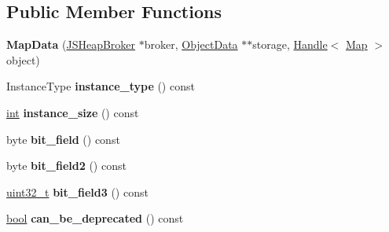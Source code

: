 \subsection*{Public Member Functions}
\begin{DoxyCompactItemize}
\item 
\mbox{\label{classv8_1_1internal_1_1compiler_1_1MapData_afeac92b6f3ab6b57eaa2a49fb5d995cc}} 
{\bfseries Map\+Data} (\mbox{\hyperlink{classv8_1_1internal_1_1compiler_1_1JSHeapBroker}{J\+S\+Heap\+Broker}} $\ast$broker, \mbox{\hyperlink{classv8_1_1internal_1_1compiler_1_1ObjectData}{Object\+Data}} $\ast$$\ast$storage, \mbox{\hyperlink{classv8_1_1internal_1_1Handle}{Handle}}$<$ \mbox{\hyperlink{classv8_1_1internal_1_1Map}{Map}} $>$ object)
\item 
\mbox{\label{classv8_1_1internal_1_1compiler_1_1MapData_a0e88b11af787f03af49e401de65ec6f8}} 
Instance\+Type {\bfseries instance\+\_\+type} () const
\item 
\mbox{\label{classv8_1_1internal_1_1compiler_1_1MapData_aab72a80b587fd67f4ea6ffae0c6bbde1}} 
\mbox{\hyperlink{classint}{int}} {\bfseries instance\+\_\+size} () const
\item 
\mbox{\label{classv8_1_1internal_1_1compiler_1_1MapData_a9962e874f9690c7dd3b7d4f01cbbf4b0}} 
byte {\bfseries bit\+\_\+field} () const
\item 
\mbox{\label{classv8_1_1internal_1_1compiler_1_1MapData_af08b7bbf9f4b204a002280684d5d6bfc}} 
byte {\bfseries bit\+\_\+field2} () const
\item 
\mbox{\label{classv8_1_1internal_1_1compiler_1_1MapData_af4507311e4d676fb171dbab8aa0d959c}} 
\mbox{\hyperlink{classuint32__t}{uint32\+\_\+t}} {\bfseries bit\+\_\+field3} () const
\item 
\mbox{\label{classv8_1_1internal_1_1compiler_1_1MapData_ae77a1da58aa3c0f82b19ae499126ffd5}} 
\mbox{\hyperlink{classbool}{bool}} {\bfseries can\+\_\+be\+\_\+deprecated} () const
$$
\end{DoxyCompactItemize}
